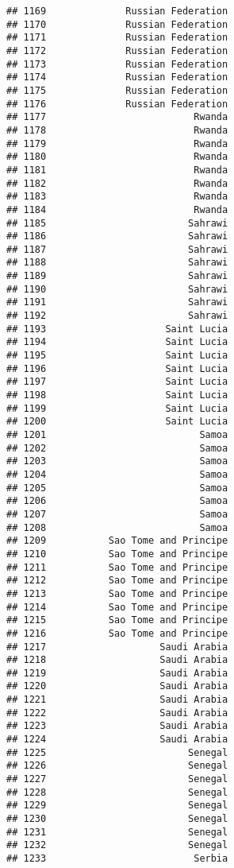 \documentclass[]{article}
\begin{document}
\begin{verbatim}
## 1169              Russian Federation
## 1170              Russian Federation
## 1171              Russian Federation
## 1172              Russian Federation
## 1173              Russian Federation
## 1174              Russian Federation
## 1175              Russian Federation
## 1176              Russian Federation
## 1177                          Rwanda
## 1178                          Rwanda
## 1179                          Rwanda
## 1180                          Rwanda
## 1181                          Rwanda
## 1182                          Rwanda
## 1183                          Rwanda
## 1184                          Rwanda
## 1185                         Sahrawi
## 1186                         Sahrawi
## 1187                         Sahrawi
## 1188                         Sahrawi
## 1189                         Sahrawi
## 1190                         Sahrawi
## 1191                         Sahrawi
## 1192                         Sahrawi
## 1193                     Saint Lucia
## 1194                     Saint Lucia
## 1195                     Saint Lucia
## 1196                     Saint Lucia
## 1197                     Saint Lucia
## 1198                     Saint Lucia
## 1199                     Saint Lucia
## 1200                     Saint Lucia
## 1201                           Samoa
## 1202                           Samoa
## 1203                           Samoa
## 1204                           Samoa
## 1205                           Samoa
## 1206                           Samoa
## 1207                           Samoa
## 1208                           Samoa
## 1209           Sao Tome and Principe
## 1210           Sao Tome and Principe
## 1211           Sao Tome and Principe
## 1212           Sao Tome and Principe
## 1213           Sao Tome and Principe
## 1214           Sao Tome and Principe
## 1215           Sao Tome and Principe
## 1216           Sao Tome and Principe
## 1217                    Saudi Arabia
## 1218                    Saudi Arabia
## 1219                    Saudi Arabia
## 1220                    Saudi Arabia
## 1221                    Saudi Arabia
## 1222                    Saudi Arabia
## 1223                    Saudi Arabia
## 1224                    Saudi Arabia
## 1225                         Senegal
## 1226                         Senegal
## 1227                         Senegal
## 1228                         Senegal
## 1229                         Senegal
## 1230                         Senegal
## 1231                         Senegal
## 1232                         Senegal
## 1233                          Serbia

\end{verbatim}
\end{document}
